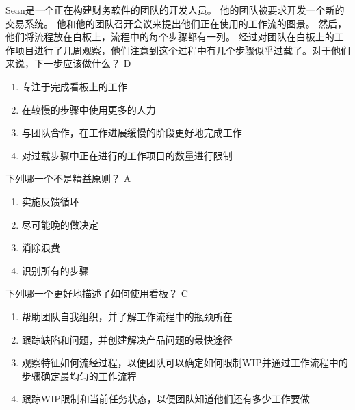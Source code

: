 \begin{problem}
	Sean是一个正在构建财务软件的团队的开发人员。 他的团队被要求开发一个新的交易系统。 他和他的团队召开会议来提出他们正在使用的工作流的图景。 然后，他们将流程放在白板上，流程中的每个步骤都有一列。 经过对团队在白板上的工作项目进行了几周观察，他们注意到这个过程中有几个步骤似乎过载了。对于他们来说，下一步应该做什么？
	\uline{D}    
        \begin{enumerate}[label=\Alph*.]
            \item 专注于完成看板上的工作
            \item 在较慢的步骤中使用更多的人力
            \item 与团队合作，在工作进展缓慢的阶段更好地完成工作
            \item 对过载步骤中正在进行的工作项目的数量进行限制
        \end{enumerate}
\end{problem}




\begin{problem}
	‍下列哪一个不是精益原则？
	\uline{A}    
    \vspace{-0.8em}
    \begin{multicols}{4}
        \begin{enumerate}[label=\Alph*.]
            \item 实施反馈循环
            \item 尽可能晚的做决定
            \item 消除浪费
            \item 识别所有的步骤
        \end{enumerate}
    \end{multicols}
    \vspace{-1em}
\end{problem}




\begin{problem}
	下列哪一个更好地描述了如何使用看板？
	\uline{C}    
        \begin{enumerate}[label=\Alph*.]
            \item 帮助团队自我组织，并了解工作流程中的瓶颈所在
            \item 跟踪缺陷和问题，并创建解决产品问题的最快途径
            \item 观察特征如何流经过程，以便团队可以确定如何限制WIP并通过工作流程中的步骤确定最均匀的工作流程
            \item 跟踪WIP限制和当前任务状态，以便团队知道他们还有多少工作要做
        \end{enumerate}
\end{problem}




